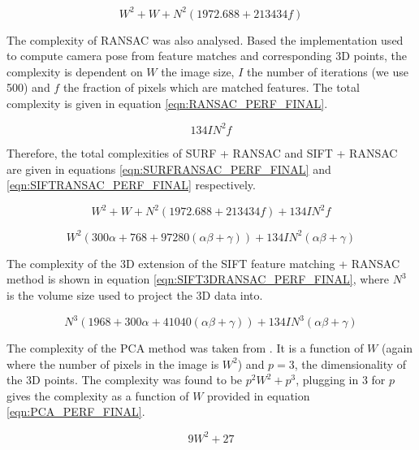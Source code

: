 \begin{equation} \label{eqn:SURF_PERF_FINAL}
W^2 + W + N^2(1972.688 + 213434f)
\end{equation}

The complexity of RANSAC was also analysed. Based the implementation used to compute camera pose from feature matches and corresponding 3D points, the complexity is dependent on $W$ the image size, $I$ the number of iterations (we use 500) and $f$ the fraction of pixels which are matched features. The total complexity is given in equation \ref{eqn:RANSAC_PERF_FINAL}.

\begin{equation} \label{eqn:RANSAC_PERF_FINAL}
134IN^2f
\end{equation}

Therefore, the total complexities of SURF + RANSAC and SIFT + RANSAC are given in equations \ref{eqn:SURFRANSAC_PERF_FINAL} and \ref{eqn:SIFTRANSAC_PERF_FINAL} respectively.


\begin{equation} \label{eqn:SURFRANSAC_PERF_FINAL}
W^2 + W + N^2(1972.688 + 213434f) + 134IN^2f
\end{equation}

\begin{equation} \label{eqn:SIFTRANSAC_PERF_FINAL}
W^2(300\alpha + 768 + 97280(\alpha \beta + \gamma)) + 134IN^2(\alpha \beta + \gamma)
\end{equation}


The complexity of the 3D extension of the SIFT feature matching + RANSAC method  is shown in equation \ref{eqn:SIFT3DRANSAC_PERF_FINAL}, where $N^3$ is the volume size used to project the 3D data into.

\begin{equation} \label{eqn:SIFT3DRANSAC_PERF_FINAL}
N^3(1968 + 300\alpha + 41040(\alpha \beta + \gamma)) + 134IN^3(\alpha \beta + \gamma)
\end{equation}

The complexity of the PCA method was taken from \cite{Johnstone04Sparse}. It is a function of $W$ (again where the number of pixels in the image is $W^2$) and $p = 3$, the dimensionality of the 3D points. The complexity was found to be $p^2W^2+p^3$, plugging in 3 for $p$ gives the complexity as a function of $W$ provided in equation \ref{eqn:PCA_PERF_FINAL}.

\begin{equation} \label{eqn:PCA_PERF_FINAL}
9W^2 + 27
\end{equation}

